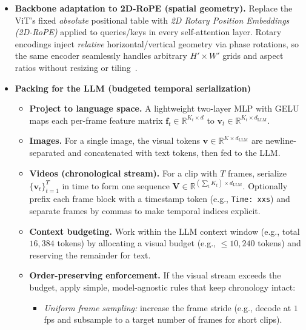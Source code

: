 \begin{enrichment}
\begin{enrichment}
\begin{itemize}
            \item \textbf{Backbone adaptation to 2D\mbox{-}RoPE (spatial geometry).} Replace the ViT’s fixed \emph{absolute} positional table with \emph{2D Rotary Position Embeddings (2D\mbox{-}RoPE)} applied to queries/keys in every self\mbox{-}attention layer. Rotary encodings inject \emph{relative} horizontal/vertical geometry via phase rotations, so the same encoder seamlessly handles arbitrary $H'\!\times\!W'$ grids and aspect ratios without resizing or tiling~\cite[Sec.~3.1]{zhang2025_videollama3,heo2024_rotarype}.
            
            \newpage
            
            \item \textbf{Packing for the LLM (budgeted temporal serialization)}%
            \begin{itemize}
                \item \textbf{Project to language space.} A lightweight two\mbox{-}layer MLP with GELU maps each per\mbox{-}frame feature matrix $\mathbf{f}_t \!\in\! \mathbb{R}^{K_t \times d}$ to $\mathbf{v}_t \!\in\! \mathbb{R}^{K_t \times d_{\text{LLM}}}$.
                \item \textbf{Images.} For a single image, the visual tokens $\mathbf{v} \!\in\! \mathbb{R}^{K \times d_{\text{LLM}}}$ are newline\mbox{-}separated and concatenated with text tokens, then fed to the LLM.
                \item \textbf{Videos (chronological stream).} For a clip with $T$ frames, serialize $\{\mathbf{v}_t\}_{t=1}^{T}$ in time to form one sequence $\mathbf{V} \!\in\! \mathbb{R}^{(\sum_t K_t) \times d_{\text{LLM}}}$. Optionally prefix each frame block with a timestamp token (e.g., \texttt{Time: xxs}) and separate frames by commas to make temporal indices explicit.
                \item \textbf{Context budgeting.} Work within the LLM context window (e.g., total $16{,}384$ tokens) by allocating a visual budget (e.g., $\leq 10{,}240$ tokens) and reserving the remainder for text.
                \item \textbf{Order\mbox{-}preserving enforcement.} If the visual stream exceeds the budget, apply simple, model\mbox{-}agnostic rules that keep chronology intact:
                \begin{itemize}
                    \item \emph{Uniform frame sampling:} increase the frame stride (e.g., decode at $1$\,fps and subsample to a target number of frames for short clips).

\end{itemize}
\end{itemize}
\end{itemize}
\end{enrichment}
\end{enrichment}
